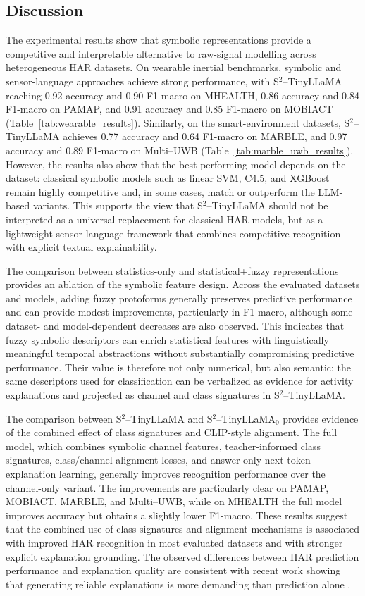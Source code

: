 \documentclass[preprint,12pt]{elsarticle}
\begin{document}
\subsection{Discussion}

The experimental results show that symbolic representations provide a competitive and interpretable alternative to raw-signal modelling across heterogeneous HAR datasets. On wearable inertial benchmarks, symbolic and sensor-language approaches achieve strong performance, with S$^2$--TinyLLaMA reaching 0.92 accuracy and 0.90 F1-macro on MHEALTH, 0.86 accuracy and 0.84 F1-macro on PAMAP, and 0.91 accuracy and 0.85 F1-macro on MOBIACT (Table~\ref{tab:wearable_results}). Similarly, on the smart-environment datasets, S$^2$--TinyLLaMA achieves 0.77 accuracy and 0.64 F1-macro on MARBLE, and 0.97 accuracy and 0.89 F1-macro on Multi--UWB (Table~\ref{tab:marble_uwb_results}). However, the results also show that the best-performing model depends on the dataset: classical symbolic models such as linear SVM, C4.5, and XGBoost remain highly competitive and, in some cases, match or outperform the LLM-based variants. This supports the view that S$^2$--TinyLLaMA should not be interpreted as a universal replacement for classical HAR models, but as a lightweight sensor-language framework that combines competitive recognition with explicit textual explainability.

The comparison between statistics-only and statistical+fuzzy representations provides an ablation of the symbolic feature design. Across the evaluated datasets and models, adding fuzzy protoforms generally preserves predictive performance and can provide modest improvements, particularly in F1-macro, although some dataset- and model-dependent decreases are also observed. This indicates that fuzzy symbolic descriptors can enrich statistical features with linguistically meaningful temporal abstractions without substantially compromising predictive performance. Their value is therefore not only numerical, but also semantic: the same descriptors used for classification can be verbalized as evidence for activity explanations and projected as channel and class signatures in S$^2$--TinyLLaMA.

The comparison between S$^2$--TinyLLaMA and S$^2$--TinyLLaMA$_0$ provides evidence of the combined effect of class signatures and CLIP-style alignment. The full model, which combines symbolic channel features, teacher-informed class signatures, class/channel alignment losses, and answer-only next-token explanation learning, generally improves recognition performance over the channel-only variant. The improvements are particularly clear on PAMAP, MOBIACT, MARBLE, and Multi--UWB, while on MHEALTH the full model improves accuracy but obtains a slightly lower F1-macro. These results suggest that the combined use of class signatures and alignment mechanisms is associated with improved HAR recognition in most evaluated datasets and with stronger explicit explanation grounding. The observed differences between HAR prediction performance and explanation quality are consistent with recent work showing that generating reliable explanations is more demanding than prediction alone \cite{quiles2026explaining}.
\end{document}
